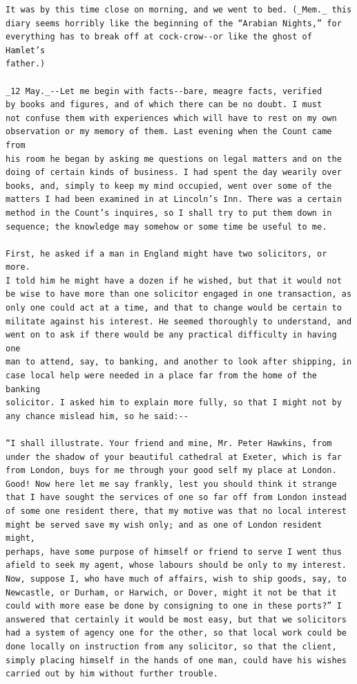 \documentclass{article}
\begin{document}
\begin{verbatim}
It was by this time close on morning, and we went to bed. (_Mem._ this
diary seems horribly like the beginning of the “Arabian Nights,” for
everything has to break off at cock-crow--or like the ghost of Hamlet’s
father.)

_12 May._--Let me begin with facts--bare, meagre facts, verified
by books and figures, and of which there can be no doubt. I must
not confuse them with experiences which will have to rest on my own
observation or my memory of them. Last evening when the Count came from
his room he began by asking me questions on legal matters and on the
doing of certain kinds of business. I had spent the day wearily over
books, and, simply to keep my mind occupied, went over some of the
matters I had been examined in at Lincoln’s Inn. There was a certain
method in the Count’s inquires, so I shall try to put them down in
sequence; the knowledge may somehow or some time be useful to me.

First, he asked if a man in England might have two solicitors, or more.
I told him he might have a dozen if he wished, but that it would not
be wise to have more than one solicitor engaged in one transaction, as
only one could act at a time, and that to change would be certain to
militate against his interest. He seemed thoroughly to understand, and
went on to ask if there would be any practical difficulty in having one
man to attend, say, to banking, and another to look after shipping, in
case local help were needed in a place far from the home of the banking
solicitor. I asked him to explain more fully, so that I might not by
any chance mislead him, so he said:--

“I shall illustrate. Your friend and mine, Mr. Peter Hawkins, from
under the shadow of your beautiful cathedral at Exeter, which is far
from London, buys for me through your good self my place at London.
Good! Now here let me say frankly, lest you should think it strange
that I have sought the services of one so far off from London instead
of some one resident there, that my motive was that no local interest
might be served save my wish only; and as one of London resident might,
perhaps, have some purpose of himself or friend to serve I went thus
afield to seek my agent, whose labours should be only to my interest.
Now, suppose I, who have much of affairs, wish to ship goods, say, to
Newcastle, or Durham, or Harwich, or Dover, might it not be that it
could with more ease be done by consigning to one in these ports?” I
answered that certainly it would be most easy, but that we solicitors
had a system of agency one for the other, so that local work could be
done locally on instruction from any solicitor, so that the client,
simply placing himself in the hands of one man, could have his wishes
carried out by him without further trouble.


\end{verbatim}
\end{document}
